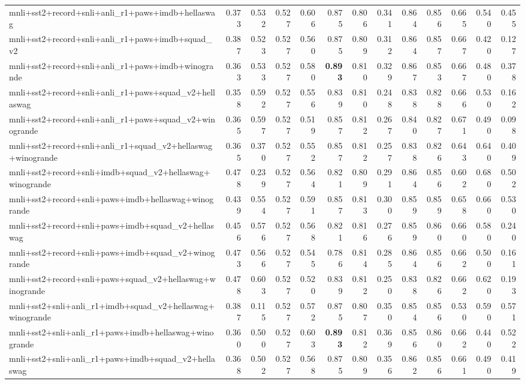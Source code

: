 \begin{table}[t]
\begin{tabular}{lrrrrrrrrrrrr}
    mnli+sst2+record+snli+anli\_r1+paws+imdb+hellaswag & 0.373 & 0.532 & 0.527 & 0.606 & 0.875 & 0.806 & 0.341 & 0.864 & 0.856 & 0.665 & 0.540 & 0.455 \\
    mnli+sst2+record+snli+anli\_r1+paws+imdb+squad\_v2 & 0.387 & 0.523 & 0.527 & 0.560 & 0.875 & 0.809 & 0.312 & 0.864 & 0.857 & 0.667 & 0.420 & 0.127 \\
    mnli+sst2+record+snli+anli\_r1+paws+imdb+winogrande & 0.363 & 0.533 & 0.527 & 0.580 & \textbf{0.893} & 0.810 & 0.329 & 0.867 & 0.853 & 0.667 & 0.480 & 0.378 \\
    mnli+sst2+record+snli+anli\_r1+paws+squad\_v2+hellaswag & 0.358 & 0.592 & 0.527 & 0.556 & 0.839 & 0.810 & 0.248 & 0.838 & 0.828 & 0.666 & 0.530 & 0.162 \\
    mnli+sst2+record+snli+anli\_r1+paws+squad\_v2+winogrande & 0.365 & 0.597 & 0.527 & 0.519 & 0.857 & 0.812 & 0.267 & 0.840 & 0.827 & 0.671 & 0.490 & 0.098 \\
    mnli+sst2+record+snli+anli\_r1+squad\_v2+hellaswag+winogrande & 0.365 & 0.370 & 0.527 & 0.552 & 0.857 & 0.812 & 0.257 & 0.838 & 0.826 & 0.643 & 0.640 & 0.409 \\
    mnli+sst2+record+snli+imdb+squad\_v2+hellaswag+winogrande & 0.478 & 0.239 & 0.527 & 0.564 & 0.821 & 0.809 & 0.291 & 0.864 & 0.856 & 0.602 & 0.680 & 0.502 \\
    mnli+sst2+record+snli+paws+imdb+hellaswag+winogrande & 0.439 & 0.554 & 0.527 & 0.591 & 0.857 & 0.813 & 0.300 & 0.859 & 0.859 & 0.658 & 0.660 & 0.530 \\
    mnli+sst2+record+snli+paws+imdb+squad\_v2+hellaswag & 0.456 & 0.576 & 0.527 & 0.568 & 0.821 & 0.816 & 0.276 & 0.859 & 0.860 & 0.660 & 0.580 & 0.240 \\
    mnli+sst2+record+snli+paws+imdb+squad\_v2+winogrande & 0.473 & 0.566 & 0.527 & 0.545 & 0.786 & 0.814 & 0.285 & 0.864 & 0.856 & 0.662 & 0.500 & 0.161 \\
    mnli+sst2+record+snli+paws+squad\_v2+hellaswag+winogrande & 0.478 & 0.603 & 0.527 & 0.520 & 0.839 & 0.812 & 0.250 & 0.838 & 0.826 & 0.662 & 0.620 & 0.193 \\
    mnli+sst2+snli+anli\_r1+imdb+squad\_v2+hellaswag+winogrande & 0.387 & 0.115 & 0.527 & 0.572 & 0.875 & 0.807 & 0.350 & 0.854 & 0.856 & 0.530 & 0.590 & 0.571 \\
    mnli+sst2+snli+anli\_r1+paws+imdb+hellaswag+winogrande & 0.360 & 0.500 & 0.527 & 0.603 & \textbf{0.893} & 0.812 & 0.369 & 0.856 & 0.860 & 0.662 & 0.440 & 0.522 \\
    mnli+sst2+snli+anli\_r1+paws+imdb+squad\_v2+hellaswag & 0.368 & 0.502 & 0.527 & 0.568 & 0.875 & 0.809 & 0.356 & 0.862 & 0.856 & 0.661 & 0.490 & 0.419 \\

\end{tabular}
\end{table}
